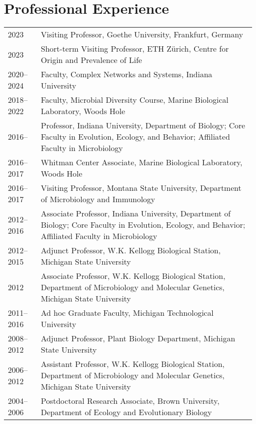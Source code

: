 \documentclass[11pt]{article}
\begin{document}
\section*{Professional Experience}
\vspace{-1.25em} %
\noindent
\begin{tabularx}{\textwidth}{@{}l@{\hspace{2em}}X@{}}
2023         & Visiting Professor, Goethe University, Frankfurt, Germany \\
2023         & Short-term Visiting Professor, ETH Zürich, Centre for Origin and Prevalence of Life \\
2020--2024   & Faculty, Complex Networks and Systems, Indiana University \\
2018--2022   & Faculty, Microbial Diversity Course, Marine Biological Laboratory, Woods Hole \\
2016--       & Professor, Indiana University, Department of Biology; Core Faculty in Evolution, Ecology, and Behavior; Affiliated Faculty in Microbiology \\
2016--2017   & Whitman Center Associate, Marine Biological Laboratory, Woods Hole \\
2016--2017   & Visiting Professor, Montana State University, Department of Microbiology and Immunology \\
2012--2016   & Associate Professor, Indiana University, Department of Biology; Core Faculty in Evolution, Ecology, and Behavior; Affiliated Faculty in Microbiology \\
2012--2015   & Adjunct Professor, W.K. Kellogg Biological Station, Michigan State University \\
2012         & Associate Professor, W.K. Kellogg Biological Station, Department of Microbiology and Molecular Genetics, Michigan State University \\
2011--2016   & Ad hoc Graduate Faculty, Michigan Technological University \\
2008--2012   & Adjunct Professor, Plant Biology Department, Michigan State University \\
2006--2012   & Assistant Professor, W.K. Kellogg Biological Station, Department of Microbiology and Molecular Genetics, Michigan State University \\
2004--2006   & Postdoctoral Research Associate, Brown University, Department of Ecology and Evolutionary Biology \\
\end{tabularx}
\end{document}
